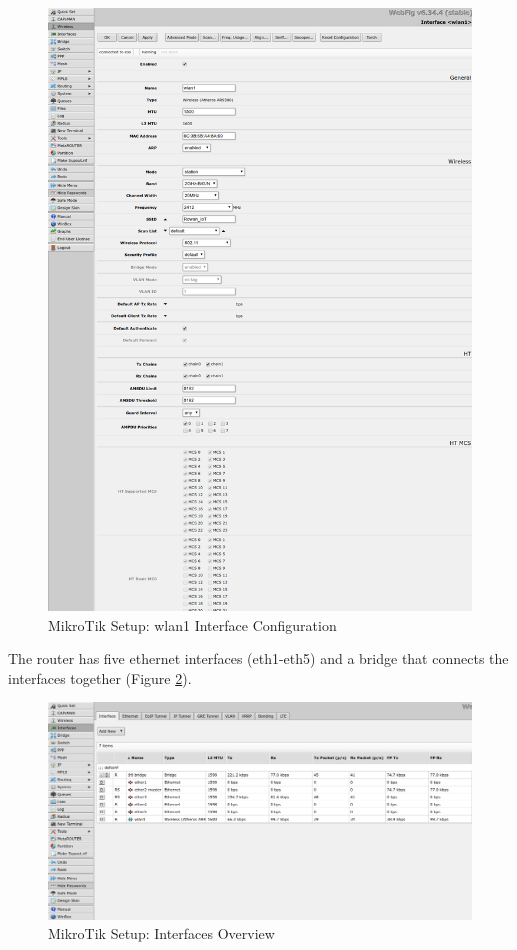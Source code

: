 \documentclass{article}
\begin{document}
\begin{figure}[H]
  \begin{center}
    \includegraphics[scale=1]{./img/mikrotik/03_wlan1_interface.png}
  \end{center}
  \caption{MikroTik Setup: wlan1 Interface Configuration}
  \label{fig:03_wlan1_interface}
\end{figure}

The router has five ethernet interfaces (eth1-eth5) and a bridge that connects
the interfaces together (Figure \ref{fig:04_interfaces}).

\begin{figure}[H]
  \begin{center}
    \includegraphics[scale=0.30]{./img/mikrotik/04_interfaces.png}
  \end{center}
  \caption{MikroTik Setup: Interfaces Overview}
  \label{fig:04_interfaces}
\end{figure}
\end{document}
